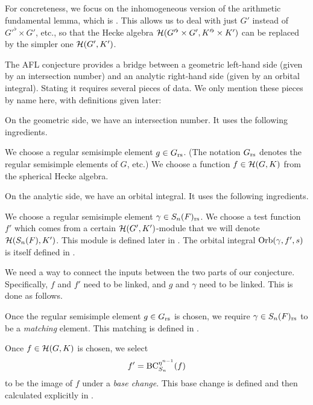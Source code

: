 For concreteness, we focus on the inhomogeneous version
of the arithmetic fundamental lemma, which is \cite[Conjecture 6.2.1]{ref:AFLspherical}.
This allows us to deal with just $G'$ instead of $G'^\flat \times G'$, etc.,
so that the Hecke algebra $\mathcal H(G'^\flat \times G', K'^\flat \times K')$
can be replaced by the simpler one $\mathcal H(G', K')$.

The AFL conjecture provides a bridge between a geometric left-hand side
(given by an intersection number)
and an analytic right-hand side (given by an orbital integral).
Stating it requires several pieces of data.
We only mention these pieces by name here, with definitions given later:
\begin{itemize}
  \ii On the geometric side, we have an intersection number.
  It uses the following ingredients.
  \begin{itemize}
    \ii We choose a regular semisimple element $g \in G_{\mathrm{rs}}$.
    (The notation $G_{\mathrm{rs}}$ denotes the regular semisimple elements of $G$, etc.)
    \ii We choose a function $f \in \mathcal H(G, K)$ from the spherical Hecke algebra.
    \ii {}
  \end{itemize}

  \ii On the analytic side, we have an orbital integral.
  It uses the following ingredients.
  \begin{itemize}
    \ii We choose a regular semisimple element $\gamma \in S_n(F)_{\mathrm{rs}}$.
    \ii We choose a test function $f'$ which comes
    from a certain $\mathcal H(G',K')$-module that we will denote $\mathcal H(S_n(F), K')$.
    This module is defined later in .
    \ii The orbital integral $\operatorname{Orb}(\gamma, f', s)$
    is itself defined in .
  \end{itemize}

  \ii We need a way to connect the inputs between the two parts of our conjecture.
  Specifically, $f$ and $f'$ need to be linked, and $g$ and $\gamma$ need to be linked.
  This is done as follows.
  \begin{itemize}
    \ii Once the regular semisimple element $g \in G_{\mathrm{rs}}$ is chosen,
    we require $\gamma \in S_n(F)_{\mathrm{rs}}$ to be a \emph{matching} element.
    This matching is defined in .

    \ii Once $f \in \mathcal H(G,K)$ is chosen, we select
    \[ f' = \operatorname{BC}_{S_n}^{\eta^{n-1}}(f) \]
    to be the image of $f$ under a \emph{base change}.
    This base change is defined and then calculated explicitly in .
  \end{itemize}
\end{itemize}
